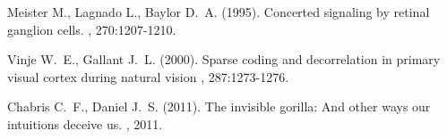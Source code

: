 \documentclass[twoside]{article}
\begin{document}
\begin{multicols}{2}
\begin{thebibliography}{99}
\bibitem[Meister et. al., 1995]
Meister M., Lagnado L., Baylor D.~A. (1995). 
\newblock Concerted signaling by retinal ganglion cells. 
, 270:1207-1210.

\bibitem[Vinje 2000]
Vinje W.~E., Gallant J.~L. (2000).
\newblock Sparse coding and decorrelation in primary visual cortex during natural vision
, 287:1273-1276.

\bibitem[Chabris et. al. 2011]
Chabris C.~F., Daniel J.~S. (2011).
\newblock The invisible gorilla: And other ways our intuitions deceive us. , 2011.

 
\end{thebibliography}



\end{multicols}
\end{document}
